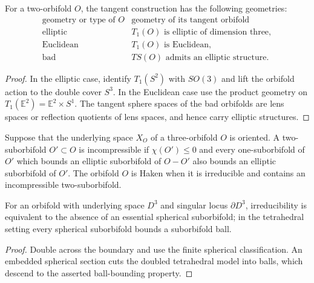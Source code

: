 \begin{proposition}
\label{thurston-ch13-unit-tangent-elliptic}

For a two-orbifold $O$, the tangent construction has the following geometries:
\[
\begin{array}{c|c}
\text{geometry or type of }O&\text{geometry of its tangent orbifold}\\ \hline
\text{elliptic}&T_1(O)\text{ is elliptic of dimension three},\\
\text{Euclidean}&T_1(O)\text{ is Euclidean},\\
\text{bad}&TS(O)\text{ admits an elliptic structure}.
\end{array}
\]
\end{proposition}
\begin{proof}
\sketch In the elliptic case, identify $T_1(S^2)$ with $SO(3)$ and lift the
orbifold action to the double cover $S^3$.  In the Euclidean case use the
product geometry on $T_1(\mathbb E^2)=\mathbb E^2\times S^1$.  The tangent
sphere spaces of the bad orbifolds are lens spaces or reflection quotients of
lens spaces, and hence carry elliptic structures.
\end{proof}

\begin{definition}
\label{thurston-ch13-incompressible-haken}

Suppose that the underlying space $X_O$ of a three-orbifold $O$ is oriented.
A two-suborbifold $O'\subset O$ is incompressible if $\chi(O')\leq0$ and every
one-suborbifold of $O'$ which bounds an elliptic suborbifold of $O-O'$ also
bounds an elliptic suborbifold of $O'$.  The orbifold $O$ is Haken when it is
irreducible and contains an incompressible two-suborbifold.
\end{definition}

\begin{proposition}
\label{thurston-ch13-tetrahedral-irreducible}

For an orbifold with underlying space $D^3$ and singular locus $\partial D^3$,
irreducibility is equivalent to the absence of an essential spherical
suborbifold; in the tetrahedral setting every spherical suborbifold bounds a
suborbifold ball.
\end{proposition}
\begin{proof}
\sketch Double across the boundary and use the finite spherical classification.
An embedded spherical section cuts the doubled tetrahedral model into balls,
which descend to the asserted ball-bounding property.
\end{proof}

